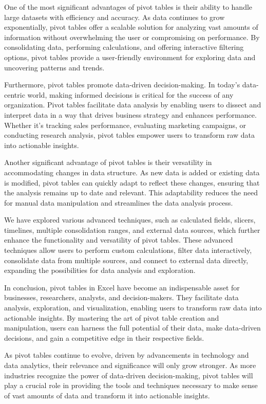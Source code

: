 \documentclass[
]{book}
\begin{document}
One of the most significant advantages of pivot tables is their ability to handle large datasets with efficiency and accuracy. As data continues to grow exponentially, pivot tables offer a scalable solution for analyzing vast amounts of information without overwhelming the user or compromising on performance. By consolidating data, performing calculations, and offering interactive filtering options, pivot tables provide a user-friendly environment for exploring data and uncovering patterns and trends.

Furthermore, pivot tables promote data-driven decision-making. In today's data-centric world, making informed decisions is critical for the success of any organization. Pivot tables facilitate data analysis by enabling users to dissect and interpret data in a way that drives business strategy and enhances performance. Whether it's tracking sales performance, evaluating marketing campaigns, or conducting research analysis, pivot tables empower users to transform raw data into actionable insights.

Another significant advantage of pivot tables is their versatility in accommodating changes in data structure. As new data is added or existing data is modified, pivot tables can quickly adapt to reflect these changes, ensuring that the analysis remains up to date and relevant. This adaptability reduces the need for manual data manipulation and streamlines the data analysis process.

We have explored various advanced techniques, such as calculated fields, slicers, timelines, multiple consolidation ranges, and external data sources, which further enhance the functionality and versatility of pivot tables. These advanced techniques allow users to perform custom calculations, filter data interactively, consolidate data from multiple sources, and connect to external data directly, expanding the possibilities for data analysis and exploration.

In conclusion, pivot tables in Excel have become an indispensable asset for businesses, researchers, analysts, and decision-makers. They facilitate data analysis, exploration, and visualization, enabling users to transform raw data into actionable insights. By mastering the art of pivot table creation and manipulation, users can harness the full potential of their data, make data-driven decisions, and gain a competitive edge in their respective fields.

As pivot tables continue to evolve, driven by advancements in technology and data analytics, their relevance and significance will only grow stronger. As more industries recognize the power of data-driven decision-making, pivot tables will play a crucial role in providing the tools and techniques necessary to make sense of vast amounts of data and transform it into actionable insights.
\end{document}
